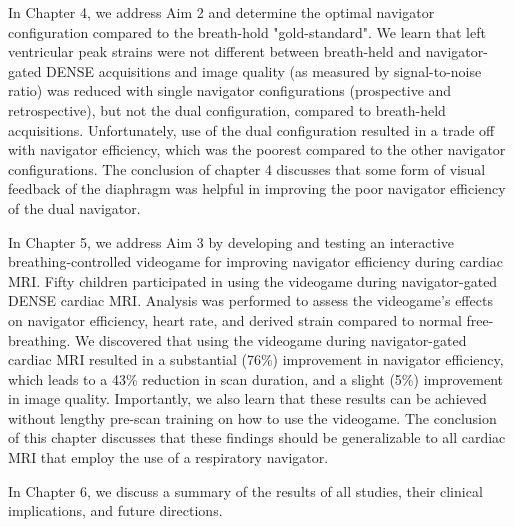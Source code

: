 	\indent In Chapter 4, we address Aim 2 and determine the optimal navigator configuration compared to the breath-hold "gold-standard". We learn that left ventricular peak strains were not different between breath-held and navigator-gated DENSE acquisitions and image quality (as measured by signal-to-noise ratio) was reduced with single navigator configurations (prospective and retrospective), but not the dual configuration, compared to breath-held acquisitions. Unfortunately, use of the dual configuration resulted in a trade off with navigator efficiency, which was the poorest compared to the other navigator configurations. The conclusion of chapter 4 discusses that some form of visual feedback of the diaphragm was helpful in improving the poor navigator efficiency of the dual navigator.
	
	\indent In Chapter 5, we address Aim 3 by developing and testing an interactive breathing-controlled videogame for improving navigator efficiency during cardiac MRI. Fifty children participated in using the videogame during navigator-gated DENSE cardiac MRI. Analysis was performed to assess the videogame's effects on navigator efficiency, heart rate, and derived strain compared to normal free-breathing. We discovered that using the videogame during navigator-gated cardiac MRI resulted in a substantial (76\%) improvement in navigator efficiency, which leads to a 43\% reduction in scan duration, and a slight (5\%) improvement in image quality. Importantly, we also learn that these results can be achieved without lengthy pre-scan training on how to use the videogame. The conclusion of this chapter discusses that these findings should be generalizable to all cardiac MRI that employ the use of a respiratory navigator.
	
	\indent In Chapter 6, we discuss a summary of the results of all studies, their clinical implications, and future directions.

